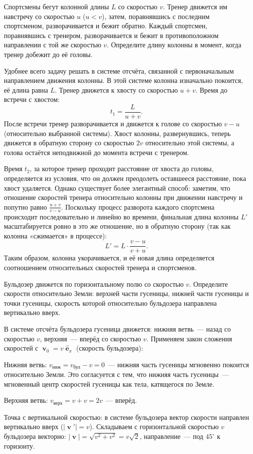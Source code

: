 \documentclass[../main.tex]{subfiles}
\begin{document}
\begin{example}
Спортсмены бегут колонной длины $L$ со скоростью $v$.
Тренер движется им навстречу со скоростью $u$ ($u < v$),
затем, поравнявшись с последним спортсменом, разворачивается
и бежит обратно. Каждый спортсмен, поравнявшись с тренером,
разворачивается и бежит в противоположном направлении с той же
скоростью $v$. Определите длину колонны в момент, когда
тренер добежит до её головы.

Удобнее всего задачу решать в системе отсчёта, связанной
с первоначальным направлением движения колонны. В этой системе
колонна изначально покоится, её длина равна $L$. Тренер
движется к хвосту со скоростью $u + v$. Время до встречи
с хвостом:
\[
    t_1 = \frac{L}{u + v}.
\]
После встречи тренер разворачивается и движется к голове
со скоростью $v - u$ (относительно выбранной системы).
Хвост колонны, развернувшись, теперь движется в обратную
сторону со скоростью $2v$ относительно этой системы,
а голова остаётся неподвижной до момента встречи с тренером.

Время $t_2$, за которое тренер проходит расстояние от хвоста
до головы, определяется из условия, что он должен преодолеть
оставшееся расстояние, пока хвост удаляется. Однако существует
более элегантный способ: заметим, что отношение скоростей
тренера относительно колонны при движении навстречу и попутно
равно $\frac{u+v}{v-u}$. Поскольку процесс разворота каждого
спортсмена происходит последовательно и линейно во времени,
финальная длина колонны $L'$ масштабируется ровно в это же
отношение, но в обратную сторону (так как колонна «сжимается»
в процессе):
\[
    L' = L \cdot \frac{v - u}{v + u}.
\]
Таким образом, колонна укорачивается, и её новая длина определяется
соотношением относительных скоростей тренера и спортсменов.
\end{example}

\begin{example}
Бульдозер движется по горизонтальному полю со скоростью $v$.
Определите скорости относительно Земли: верхней части гусеницы,
нижней части гусеницы и точки гусеницы, скорость которой
относительно бульдозера направлена вертикально вверх.

В системе отсчёта бульдозера гусеница движется: нижняя ветвь~---
назад со скоростью $v$, верхняя~--- вперёд со скоростью $v$.
Применяем закон сложения скоростей с $\mbfv_0 = v\hat{\mbfe}_x$
(скорость бульдозера):

Нижняя ветвь: $v_{\text{ниж}} = v_{\text{бул}} - v = 0$~--- нижняя
часть гусеницы мгновенно покоится относительно Земли. Это
согласуется с тем, что нижняя часть гусеницы~--- мгновенный центр
скоростей гусеницы как тела, катящегося по Земле.

Верхняя ветвь: $v_{\text{верх}} = v + v = 2v$~--- вперёд.

Точка с вертикальной скоростью: в системе бульдозера вектор
скорости направлен вертикально вверх ($|\mbfv'| = v$).
Складываем с горизонтальной скоростью $v$ бульдозера векторно:
$|\mbfv| = \sqrt{v^2 + v^2} = v\sqrt{2}$, направление~--- под $45^\circ$
к горизонту.
\end{example}
\end{document}
